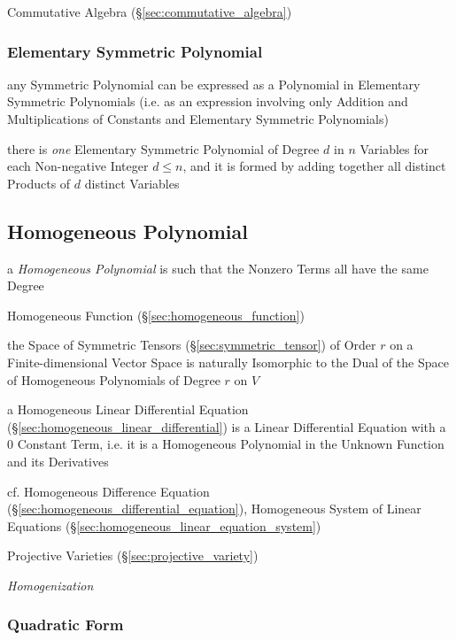 \fist Commutative Algebra (\S\ref{sec:commutative_algebra})



\subsubsection{Elementary Symmetric Polynomial}\label{sec:elementary_symmetric}

any Symmetric Polynomial can be expressed as a Polynomial in Elementary
Symmetric Polynomials (i.e. as an expression involving only Addition and
Multiplications of Constants and Elementary Symmetric Polynomials)

there is \emph{one} Elementary Symmetric Polynomial of Degree $d$ in $n$
Variables for each Non-negative Integer $d \leq n$, and it is formed by adding
together all distinct Products of $d$ distinct Variables



\subsection{Homogeneous Polynomial}\label{sec:homogeneous_polynomial}

a \emph{Homogeneous Polynomial} is such that the Nonzero Terms all have the same
Degree

Homogeneous Function (\S\ref{sec:homogeneous_function})

the Space of Symmetric Tensors (\S\ref{sec:symmetric_tensor}) of Order $r$ on a
Finite-dimensional Vector Space is naturally Isomorphic to the Dual of the
Space of Homogeneous Polynomials of Degree $r$ on $V$

a Homogeneous Linear Differential Equation
(\S\ref{sec:homogeneous_linear_differential}) is a Linear Differential
Equation with a $0$ Constant Term, i.e. it is a Homogeneous Polynomial in the
Unknown Function and its Derivatives

cf. Homogeneous Difference Equation
(\S\ref{sec:homogeneous_differential_equation}),
Homogeneous System of Linear Equations
(\S\ref{sec:homogeneous_linear_equation_system})

Projective Varieties (\S\ref{sec:projective_variety})

\emph{Homogenization}



\subsubsection{Quadratic Form}\label{sec:quadratic_form}

